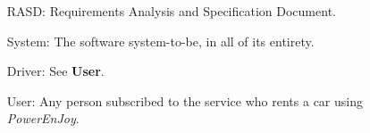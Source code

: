 \begin{itemize}
\item[RASD:] Requirements Analysis and Specification Document.
\item[System:] The software system-to-be, in all of its entirety.
\item[Driver:] See \textbf{User}.
\item[User:] Any person subscribed to the service who rents a car using \hbox{\emph{PowerEnJoy}}.
\end{itemize}